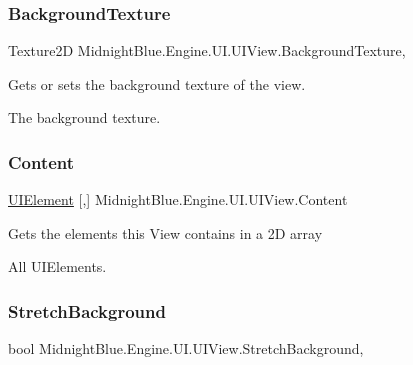 \subsubsection{\texorpdfstring{Background\+Texture}{BackgroundTexture}}
{\footnotesize\ttfamily Texture2D Midnight\+Blue.\+Engine.\+U\+I.\+U\+I\+View.\+Background\+Texture\hspace{0.3cm}{\ttfamily [get]}, {\ttfamily [set]}}



Gets or sets the background texture of the view. 

The background texture.\hypertarget{class_midnight_blue_1_1_engine_1_1_u_i_1_1_u_i_view_afa135eeb28b11055b98404ae9090f9c9}{}\label{class_midnight_blue_1_1_engine_1_1_u_i_1_1_u_i_view_afa135eeb28b11055b98404ae9090f9c9} 
\subsubsection{\texorpdfstring{Content}{Content}}
{\footnotesize\ttfamily \hyperlink{class_midnight_blue_1_1_engine_1_1_u_i_1_1_u_i_element}{U\+I\+Element} \mbox{[},\mbox{]} Midnight\+Blue.\+Engine.\+U\+I.\+U\+I\+View.\+Content\hspace{0.3cm}{\ttfamily [get]}}



Gets the elements this View contains in a 2D array 

All U\+I\+Elements.\hypertarget{class_midnight_blue_1_1_engine_1_1_u_i_1_1_u_i_view_ab7cdc0c4026c631e292bf2a33cded169}{}\label{class_midnight_blue_1_1_engine_1_1_u_i_1_1_u_i_view_ab7cdc0c4026c631e292bf2a33cded169} 
\subsubsection{\texorpdfstring{Stretch\+Background}{StretchBackground}}
{\footnotesize\ttfamily bool Midnight\+Blue.\+Engine.\+U\+I.\+U\+I\+View.\+Stretch\+Background\hspace{0.3cm}{\ttfamily [get]}, {\ttfamily [set]}}



